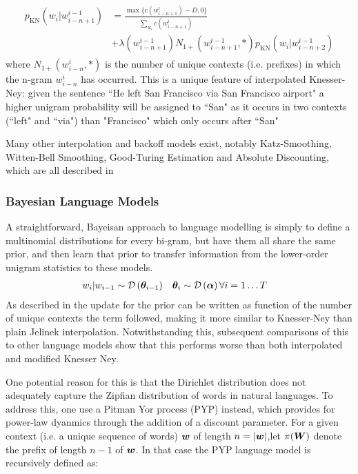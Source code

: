 \begin{align}
\begin{split}
p_\text{KN}(w_i | w^{i-1}_{i-n+1}) & = 
\frac{\max\{c(w^i_{i-n+1}) - D, 0\}}{\sum_{w_i} c(w^i_{i-n+1})} \\
& + \lambda(w^{i-1}_{i-n+1}) N_{1+}(w^{i-1}_{i-n+1}, *) p_\text{KN}(w_i | w^{i-1}_{i-n+2})
\end{split}
\end{align}
where $N_{1+}(w^{i}_{i-n}, *)$ is the number of unique contexts (i.e. prefixes) in which the n-gram $w^{i}_{i-n}$ has occurred.  This is a unique feature of interpolated Knesser-Ney: given the sentence ``He left San Francisco via San Francisco airport" a higher unigram probability will be assigned to ``San" as it occurs in two contexts (``left" and ``via") than "Francisco" which only occurs after ``San"

Many other interpolation and backoff models exist, notably Katz-Smoothing, Witten-Bell Smoothing, Good-Turing Estimation and Absolute Discounting, which are all described in \cite{Goodman2001}

\subsubsection*{Bayesian Language Models}
A straightforward, Bayeisan approach to language modelling is simply to define a multinomial distributions for every bi-gram, but have them all share the same prior, and then learn that prior to transfer information from the lower-order unigram statistics to these models.
\begin{align}
w_i|w_{i-1} & \sim \mathcal{D} \left( {\bm \theta_{i-1}} \right) & \bm \theta_i & \sim \mathcal{D} \left( {\bm \alpha} \right) \forall i = 1\ldots T
\end{align}
As described in\cite{MacKay1995} the update for the prior can be written as function of the number of unique contexts the term followed, making it more similar to Knesser-Ney than plain Jelinek interpolation. Notwithstanding this, subsequent comparisons of this to other language models show\cite{Teh} that this performs worse than both interpolated and modified Knesser Ney.

One potential reason for this is that the Dirichlet distribution does not adequately capture the Zipfian distribution of words in natural languages. To address this, one use a Pitman Yor process (PYP) instead, which provides for power-law dyanmics through the addition of a discount parameter. For a given context (i.e. a unique sequence of words) $\bm w$ of length $n = |\bm w|$,let $\pi(\bm W)$ denote the prefix of length $n-1$ of $\bm w$. In that case the PYP language model is recursively defined as\cite{Teh}:

